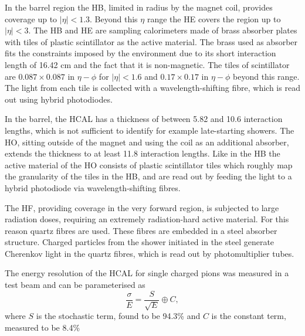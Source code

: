 In the barrel region the \ac{HB}, limited in radius by the magnet coil, provides
coverage up to $|\eta|<1.3$. Beyond this $\eta$ range the \ac{HE} covers
the region up to $|\eta|<3$. The \ac{HB} and \ac{HE} are sampling calorimeters made of brass absorber
plates with tiles of plastic scintillator as the active material. The brass used as 
absorber fits the constraints imposed by the environment due to its short interaction length
of 16.42 cm and the fact that it is non-magnetic. The tiles of scintillator 
are $0.087 \times 0.087$ in $\eta-\phi$ for $|\eta|<1.6$ and $0.17\times0.17$ in $\eta-\phi$
beyond this range. The light from each tile is collected with a wavelength-shifting fibre, 
which is read out using hybrid photodiodes. 

In the barrel, the \ac{HCAL}
has a thickness of between 5.82 and 10.6 interaction lengths, which is not 
sufficient to identify for example late-starting showers. The \ac{HO}, sitting
outside of the magnet and using the coil as an additional absorber, extends the 
thickness to at least 11.8 interaction lengths. 
Like in the \ac{HB} the active material of the \ac{HO} consists of plastic scintillator tiles which roughly
map the granularity of the tiles in the \ac{HB}, and are read out by feeding the light
to a hybrid photodiode via wavelength-shifting fibres.

The \ac{HF}, providing coverage in the very forward region, is 
subjected to large radiation doses, requiring an extremely
radiation-hard active material. For this reason quartz
fibres are used. These fibres are embedded
in a steel absorber structure. Charged particles from the
shower initiated in the steel generate Cherenkov light in 
the quartz fibres, which is read out by photomultiplier tubes.

The energy resolution of the \ac{HCAL} for single charged pions 
was measured in a test beam \cite{cms-hcalecal}
and can be parameterised as 
\begin{equation}\label{eqn:hcal_res}
\frac{\sigma}{E} = \frac{S}{\sqrt{E}} \oplus C,
\end{equation}
where $S$ is the stochastic term, found to be 94.3\% %
and $C$ is the constant term, measured to be 8.4\% %

